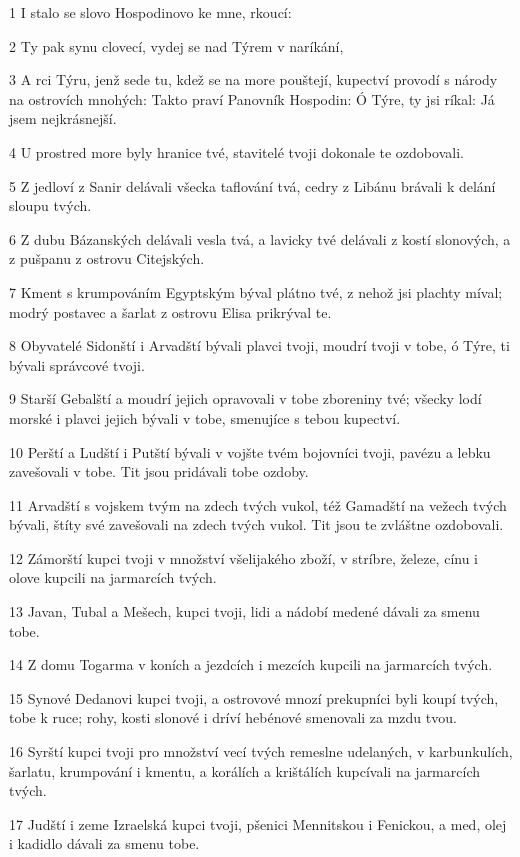 \par 1 I stalo se slovo Hospodinovo ke mne, rkoucí:
\par 2 Ty pak synu clovecí, vydej se nad Týrem v naríkání,
\par 3 A rci Týru, jenž sede tu, kdež se na more pouštejí, kupectví provodí s národy na ostrovích mnohých: Takto praví Panovník Hospodin: Ó Týre, ty jsi ríkal: Já jsem nejkrásnejší.
\par 4 U prostred more byly hranice tvé, stavitelé tvoji dokonale te ozdobovali.
\par 5 Z jedloví z Sanir delávali všecka taflování tvá, cedry z Libánu brávali k delání sloupu tvých.
\par 6 Z dubu Bázanských delávali vesla tvá, a lavicky tvé delávali z kostí slonových, a z pušpanu z ostrovu Citejských.
\par 7 Kment s krumpováním Egyptským býval plátno tvé, z nehož jsi plachty míval; modrý postavec a šarlat z ostrovu Elisa prikrýval te.
\par 8 Obyvatelé Sidonští i Arvadští bývali plavci tvoji, moudrí tvoji v tobe, ó Týre, ti bývali správcové tvoji.
\par 9 Starší Gebalští a moudrí jejich opravovali v tobe zboreniny tvé; všecky lodí morské i plavci jejich bývali v tobe, smenujíce s tebou kupectví.
\par 10 Perští a Ludští i Putští bývali v vojšte tvém bojovníci tvoji, pavézu a lebku zavešovali v tobe. Tit jsou pridávali tobe ozdoby.
\par 11 Arvadští s vojskem tvým na zdech tvých vukol, též Gamadští na vežech tvých bývali, štíty své zavešovali na zdech tvých vukol. Tit jsou te zvláštne ozdobovali.
\par 12 Zámorští kupci tvoji v množství všelijakého zboží, v stríbre, železe, cínu i olove kupcili na jarmarcích tvých.
\par 13 Javan, Tubal a Mešech, kupci tvoji, lidi a nádobí medené dávali za smenu tobe.
\par 14 Z domu Togarma v koních a jezdcích i mezcích kupcili na jarmarcích tvých.
\par 15 Synové Dedanovi kupci tvoji, a ostrovové mnozí prekupníci byli koupí tvých, tobe k ruce; rohy, kosti slonové i dríví hebénové smenovali za mzdu tvou.
\par 16 Syrští kupci tvoji pro množství vecí tvých remeslne udelaných, v karbunkulích, šarlatu, krumpování i kmentu, a korálích a krištálích kupcívali na jarmarcích tvých.
\par 17 Judští i zeme Izraelská kupci tvoji, pšenici Mennitskou i Fenickou, a med, olej i kadidlo dávali za smenu tobe.
